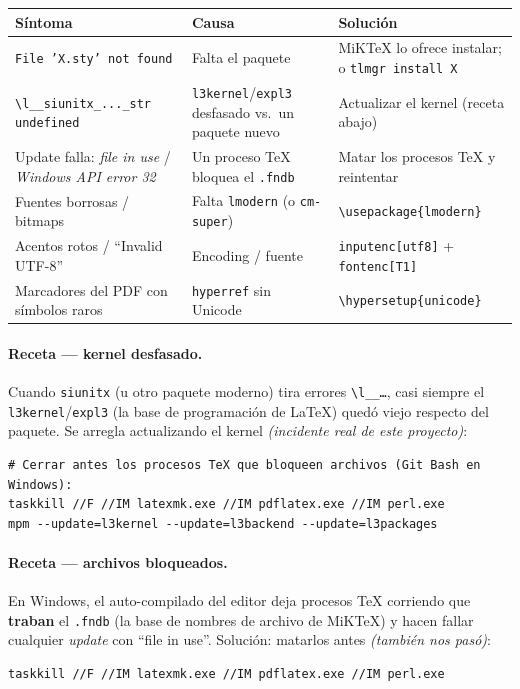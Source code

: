 \documentclass[11pt,a4paper]{article}
\newcommand{\C}[1]{\texttt{\textbackslash #1}}
\begin{document}
\begin{center}\small
\renewcommand{\arraystretch}{1.4}
\begin{tabularx}{\linewidth}{@{}X X X@{}}
\toprule
\textbf{Síntoma} & \textbf{Causa} & \textbf{Solución} \\
\midrule
\texttt{File 'X.sty' not found} & Falta el paquete & MiKTeX lo ofrece instalar; o \texttt{tlmgr install X} \\
\texttt{\textbackslash l\_\_siunitx\_...\_str undefined} & \texttt{l3kernel}/\texttt{expl3} desfasado vs.\ un paquete nuevo & Actualizar el kernel (receta abajo) \\
Update falla: \emph{file in use} / \emph{Windows API error 32} & Un proceso TeX bloquea el \texttt{.fndb} & Matar los procesos TeX y reintentar \\
Fuentes borrosas / bitmaps & Falta \texttt{lmodern} (o \texttt{cm-super}) & \C{usepackage\{lmodern\}} \\
Acentos rotos / \enquote{Invalid UTF-8} & Encoding / fuente & \texttt{inputenc[utf8]} + \texttt{fontenc[T1]} \\
Marcadores del PDF con símbolos raros & \texttt{hyperref} sin Unicode & \C{hypersetup\{unicode\}} \\
\bottomrule
\end{tabularx}
\end{center}

\paragraph{Receta — kernel desfasado.} Cuando \texttt{siunitx} (u otro paquete
moderno) tira errores \texttt{\textbackslash l\_\_\dots}, casi siempre el
\texttt{l3kernel}/\texttt{expl3} (la base de programación de \LaTeX) quedó viejo
respecto del paquete. Se arregla actualizando el kernel \emph{(incidente real de
este proyecto)}:
\begin{lstlisting}
# Cerrar antes los procesos TeX que bloqueen archivos (Git Bash en Windows):
taskkill //F //IM latexmk.exe //IM pdflatex.exe //IM perl.exe
mpm --update=l3kernel --update=l3backend --update=l3packages
\end{lstlisting}

\paragraph{Receta — archivos bloqueados.} En Windows, el auto-compilado del
editor deja procesos TeX corriendo que \textbf{traban} el \texttt{.fndb} (la base
de nombres de archivo de MiKTeX) y hacen fallar cualquier \emph{update} con
\enquote{file in use}. Solución: matarlos antes \emph{(también nos pasó)}:
\begin{lstlisting}
taskkill //F //IM latexmk.exe //IM pdflatex.exe //IM perl.exe
\end{lstlisting}
\end{document}

